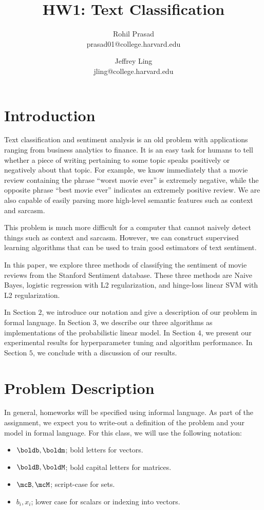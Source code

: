 \documentclass[11pt]{article}
\title{HW1: Text Classification}
\author{Rohil Prasad \\ prasad01@college.harvard.edu \and Jeffrey Ling \\ jling@college.harvard.edu }
\begin{document}
\maketitle{}
\section{Introduction}

Text classification and sentiment analysis is an old problem with applications ranging from business analytics to finance.
It is an easy task for humans to tell whether a piece of writing pertaining to some topic speaks positively or negatively about that topic. 
For example, we know immediately that a movie review containing the phrase ``worst movie ever'' is extremely negative, while the opposite phrase 
``best movie ever'' indicates an extremely positive review. We are also capable of easily parsing more high-level semantic features such as context and sarcasm.

This problem is much more difficult for a computer that cannot naively detect things such as context and sarcasm. However, we can construct supervised learning algorithms that 
can be used to train good estimators of text sentiment. 

In this paper, we explore three methods of classifying the sentiment of movie reviews from the Stanford Sentiment database. These three methods are Naive Bayes, 
logistic regression with L2 regularization, and hinge-loss linear SVM with L2 regularization. 

In Section $2$, we introduce our notation and give a description of our problem in formal language. In Section $3$, we describe our three algorithms as implementations of 
the probabilistic linear model. In Section $4$, we present our experimental results for hyperparameter tuning and algorithm performance. In Section $5$, we conclude with a 
discussion of our results. 

\section{Problem Description}

In general, homeworks will be specified using informal
language. As part of the assignment, we expect you to write-out a
definition of the problem and your model in formal language. For this
class, we will use the following notation:

\begin{itemize}
\item $\boldb, \boldm$;  bold letters for vectors.
\item $\boldB, \boldM$;  bold capital letters for matrices.
\item $\mcB, \mcM$;  script-case for sets.
\item $b_i, x_i$; lower case for scalars or indexing into vectors.
\end{itemize}
\end{document}
